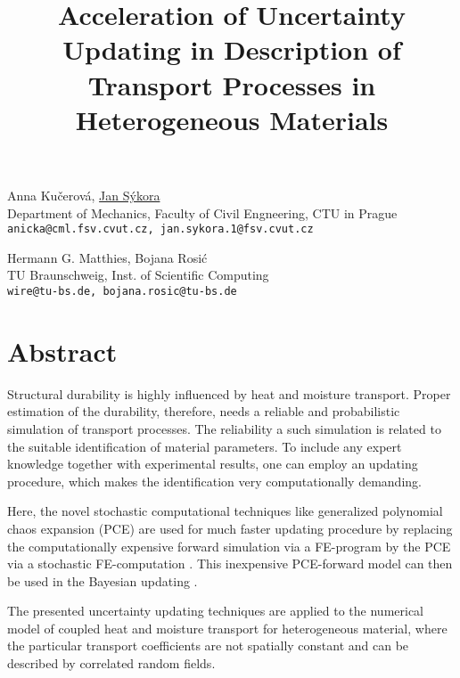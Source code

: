 \title{Acceleration of Uncertainty Updating in Description of Transport Processes in Heterogeneous Materials}
\author{} \institute{}
\maketitle

\begin{center}
{\large Anna Ku\v{c}erov\'a, \underline{Jan S\'ykora}}\\
Department of Mechanics, Faculty of Civil Engneering, CTU in Prague\\
{\tt anicka@cml.fsv.cvut.cz, jan.sykora.1@fsv.cvut.cz}\\
\vspace{4mm}

{\large Hermann G. Matthies, Bojana Rosi\'c}\\
TU Braunschweig, Inst. of Scientific Computing\\
{\tt wire@tu-bs.de, bojana.rosic@tu-bs.de}
\end{center}

\section*{Abstract}
Structural durability is highly influenced by heat and moisture transport. Proper estimation of the durability, therefore, needs a reliable and probabilistic simulation of transport processes.  The reliability a such simulation is related to the suitable identification of material parameters. To include any expert knowledge together with experimental results, one can employ an updating procedure, which makes the identification very computationally demanding.

Here, the novel stochastic computational techniques like generalized polynomial chaos expansion (PCE) are used for much faster updating procedure by replacing the computationally expensive forward simulation via a FE-program by the PCE via a stochastic FE-computation \cite{Matthies:2007:IB}. This inexpensive PCE-forward model can then be used in the Bayesian updating \cite{Kucerova:2010:AMC}.

The presented uncertainty updating techniques are applied to the numerical model of coupled heat and moisture transport \cite{Kunzel:1997} for heterogeneous material, where the particular transport coefficients are not spatially constant and can be described by correlated random fields.


